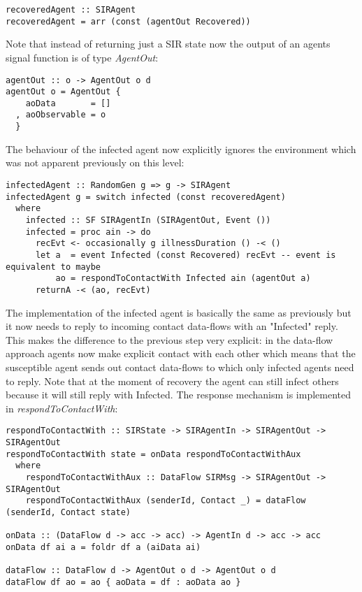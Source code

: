 \begin{verbatim}
recoveredAgent :: SIRAgent
recoveredAgent = arr (const (agentOut Recovered))
\end{verbatim}

Note that instead of returning just a SIR state now the output of an agents signal function is of type \textit{AgentOut}:

\begin{verbatim}
agentOut :: o -> AgentOut o d
agentOut o = AgentOut {
    aoData       = []
  , aoObservable = o
  }
\end{verbatim}

The behaviour of the infected agent now explicitly ignores the environment which was not apparent previously on this level:

\begin{verbatim}
infectedAgent :: RandomGen g => g -> SIRAgent
infectedAgent g = switch infected (const recoveredAgent)
  where
    infected :: SF SIRAgentIn (SIRAgentOut, Event ())
    infected = proc ain -> do
      recEvt <- occasionally g illnessDuration () -< ()
      let a  = event Infected (const Recovered) recEvt -- event is equivalent to maybe
          ao = respondToContactWith Infected ain (agentOut a)
      returnA -< (ao, recEvt)
\end{verbatim}

The implementation of the infected agent is basically the same as previously but it now needs to reply to incoming contact data-flows with an "Infected" reply. This makes the difference to the previous step very explicit: in the data-flow approach agents now make explicit contact with each other which means that the susceptible agent sends out contact data-flows to which only infected agents need to reply. Note that at the moment of recovery the agent can still infect others because it will still reply with Infected. The response mechanism is implemented in \textit{respondToContactWith}:

\begin{verbatim}
respondToContactWith :: SIRState -> SIRAgentIn -> SIRAgentOut -> SIRAgentOut
respondToContactWith state = onData respondToContactWithAux
  where
    respondToContactWithAux :: DataFlow SIRMsg -> SIRAgentOut -> SIRAgentOut
    respondToContactWithAux (senderId, Contact _) = dataFlow (senderId, Contact state)
    
onData :: (DataFlow d -> acc -> acc) -> AgentIn d -> acc -> acc
onData df ai a = foldr df a (aiData ai)

dataFlow :: DataFlow d -> AgentOut o d -> AgentOut o d
dataFlow df ao = ao { aoData = df : aoData ao }
\end{verbatim}

